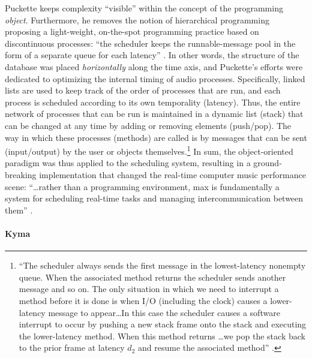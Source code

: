 	Puckette keeps complexity ``visible'' within the concept of the programming \textit{object}. Furthermore, he removes the notion of hierarchical programming proposing a light-weight, on-the-spot programming practice based on discontinuous processes: ``the scheduler keeps the runnable-message pool in the form of a separate queue for each latency'' \parencite[46]{DBLP:conf/icmc/Puckette86}. In other words, the structure of the database was placed \textit{horizontally} along the time axis, and Puckette's efforts were dedicated to optimizing the internal timing of audio processes. Specifically, linked lists are used to keep track of the order of processes that are run, and each process is scheduled according to its own temporality (latency). Thus, the entire network of processes that can be run is maintained in a dynamic list (stack) that can be changed at any time by adding or removing elements (push/pop). The way in which these processes (methods) are called is by messages that can be sent (input/output) by the user or objects themselves.\footnote{``The scheduler always sends the first message in the lowest-latency nonempty queue. When the associated method returns the scheduler sends another message and so on. The only situation in which we need to interrupt a method before it is done is when I/O (including the clock) causes a lower-latency message to appear\dots In this case the scheduler causes a software interrupt to occur by pushing a new stack frame onto the stack and executing the lower-latency method. When this method returns \dots we pop the stack back to the prior frame at latency \(d_2\) and resume the associated method'' \parencite[46]{DBLP:conf/icmc/Puckette86}.} In sum, the object-oriented paradigm was thus applied to the scheduling system, resulting in a ground-breaking implementation that changed the real-time computer music performance scene: ``\dots rather than a programming environment, \gls{max} is fundamentally a system for scheduling real-time tasks and managing intercommunication between them'' \parencite{DBLP:journals/comj/Puckette02}.

	\paragraph{Kyma}
	\label{computer:kyma}

